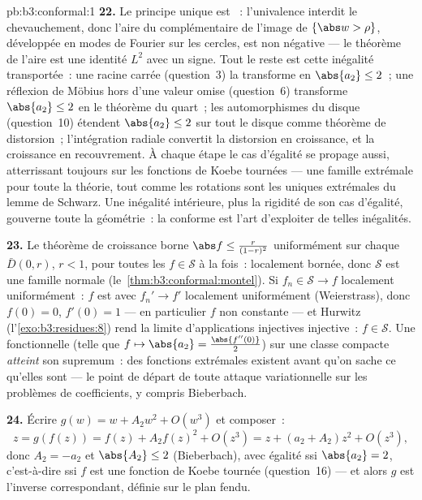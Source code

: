 \begin{solution}{pb:b3:conformal:1}
\textbf{22.} Le principe unique est ~: l'univalence
interdit le chevauchement, donc l'aire du complémentaire de
l'image de $\{\abs w > \rho\}$, développée en modes de
Fourier sur les cercles, est non négative --- le théorème
de l'aire est une identité $L^2$ avec un signe. Tout le
reste est cette inégalité transportée~: une racine carrée
(question~3) la transforme en $\abs{a_2} \leq 2$~; une
réflexion de Möbius hors d'une valeur omise (question~6)
transforme $\abs{a_2} \leq 2$ en le théorème du quart~; les
automorphismes du disque (question~10) étendent $\abs{a_2}
\leq 2$ sur tout le disque comme théorème de distorsion~;
l'intégration radiale convertit la distorsion en
croissance, et la croissance en recouvrement. À chaque
étape le cas d'égalité se propage aussi, atterrissant
toujours sur les fonctions de Koebe tournées --- une
famille extrémale pour toute la théorie, tout comme les
rotations sont les uniques extrémales du lemme de Schwarz.
Une inégalité intérieure, plus la rigidité de son cas
d'égalité, gouverne toute la géométrie~: la
 conforme est l'art d'exploiter de telles
inégalités.

\textbf{23.} Le théorème de croissance borne $\abs f \leq
\frac{r}{(1-r)^2}$ uniformément sur chaque $\bar D(0, r)$,
$r < 1$, pour toutes les $f \in \mathcal S$ à la fois~:
localement bornée, donc $\mathcal S$ est une famille
normale (le~\cref{thm:b3:conformal:montel}). Si $f_n \in
\mathcal S \to f$ localement uniformément~: $f$ est
 avec $f_n' \to f'$ localement uniformément
(Weierstrass), donc $f(0) = 0$, $f'(0) = 1$ --- en
particulier $f$ non constante --- et Hurwitz
(l'\cref{exo:b3:residues:8}) rend la limite d'applications
injectives injective~: $f \in \mathcal S$. Une
fonctionnelle  (telle que $f \mapsto \abs{a_2} =
\frac{\abs{f''(0)}}2$) sur une classe compacte
\emph{atteint} son supremum~: des fonctions extrémales
existent avant qu'on sache ce qu'elles sont --- le point de
départ de toute attaque variationnelle sur les problèmes de
coefficients, y compris Bieberbach.

\textbf{24.} Écrire $g(w) = w + A_2w^2 + O(w^3)$ et
composer~:
\[
z = g(f(z)) = f(z) + A_2f(z)^2 + O(z^3)
= z + (a_2 + A_2)z^2 + O(z^3),
\]
donc $A_2 = -a_2$ et $\abs{A_2} \leq 2$ (Bieberbach), avec
égalité ssi $\abs{a_2} = 2$, c'est-à-dire ssi $f$ est une
fonction de Koebe tournée (question~16) --- et alors $g$
est l'inverse correspondant, définie sur le plan fendu.


\end{solution}
